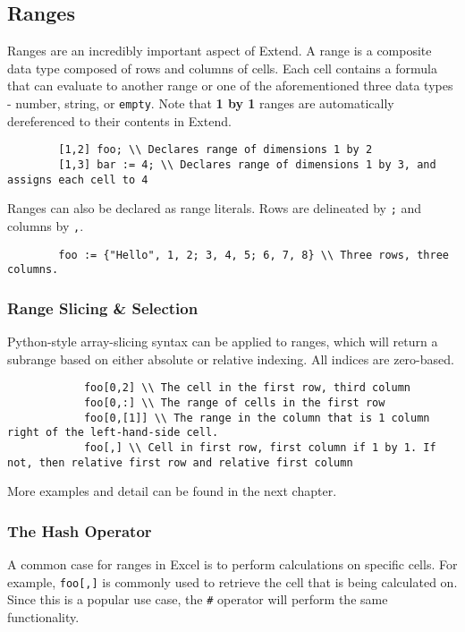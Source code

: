 	\subsection{Ranges}
	Ranges are an incredibly important aspect of Extend. A range is a composite data type composed of rows and columns of cells.
	Each cell contains a formula that can evaluate to another range or one of the aforementioned three data types - number, string, or \texttt{empty}. Note that \textbf{1 by 1} ranges are automatically dereferenced to their contents in Extend.

	\begin{lstlisting}
		[1,2] foo; \\ Declares range of dimensions 1 by 2
		[1,3] bar := 4; \\ Declares range of dimensions 1 by 3, and assigns each cell to 4
	\end{lstlisting}

	\medskip \noindent
	Ranges can also be declared as range literals. Rows are delineated by \texttt{;} and columns by \texttt{,}.

	\begin{lstlisting}
		foo := {"Hello", 1, 2; 3, 4, 5; 6, 7, 8} \\ Three rows, three columns.
	\end{lstlisting}

		\subsubsection{Range Slicing \& Selection}
		Python-style array-slicing syntax can be applied to ranges, which will return a subrange based on either absolute or relative indexing. All indices are zero-based.

		\begin{lstlisting}
			foo[0,2] \\ The cell in the first row, third column
			foo[0,:] \\ The range of cells in the first row
			foo[0,[1]] \\ The range in the column that is 1 column right of the left-hand-side cell.
			foo[,] \\ Cell in first row, first column if 1 by 1. If not, then relative first row and relative first column
		\end{lstlisting}

		\medskip \noindent
		More examples and detail can be found in the next chapter.

		\subsubsection{The Hash Operator}
		A common case for ranges in Excel is to perform calculations on specific cells. For example, \texttt{foo[,]} is commonly used to retrieve the cell that is being calculated on.
		Since this is a popular use case, the \texttt{\#} operator will perform the same functionality.


